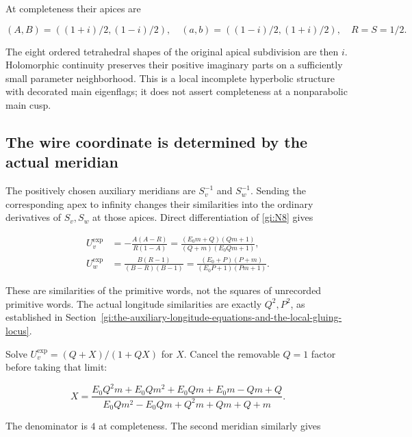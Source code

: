 At completeness their apices are

\begin{equation}\label{gi:N10}
(A,B)=((1+i)/2,(1-i)/2),\quad
 (a,b)=((1-i)/2,(1+i)/2),\quad R=S=1/2.
\end{equation}

The eight ordered tetrahedral shapes of the original apical
subdivision are then \(i\). Holomorphic continuity preserves their
positive imaginary parts on a sufficiently small parameter
neighborhood. This is a local incomplete hyperbolic structure with
decorated main eigenflags; it does not assert completeness at a
nonparabolic main cusp.

\subsection{The wire coordinate is determined by the actual meridian}\label{gi:the-wire-coordinate-is-determined-by-the-actual-meridian}

The positively chosen auxiliary meridians are \(S_v^{-1}\) and
\(S_w^{-1}\). Sending the corresponding apex to infinity changes
their similarities into the ordinary derivatives of \(S_v,S_w\)
at those apices. Direct differentiation of \eqref{gi:N8} gives

\begin{equation}\label{gi:N11}
\begin{aligned}
 U_v^{\exp}
 &=-\frac{A(A-R)}{R(1-A)}
   =\frac{(E_0m+Q)(Qm+1)}{(Q+m)(E_0Qm+1)},\\
 U_w^{\exp}
 &=\frac{B(R-1)}{(B-R)(B-1)}
   =\frac{(E_0+P)(P+m)}{(E_0P+1)(Pm+1)}.
\end{aligned}
\end{equation}

These are similarities of the primitive words, not the squares of
unrecorded primitive words. The actual longitude similarities are
exactly \(Q^2,P^2\), as established in Section~\ref{gi:the-auxiliary-longitude-equations-and-the-local-gluing-locus}.

Solve \(U_v^{\exp}=(Q+X)/(1+QX)\) for \(X\).
Cancel the removable \(Q=1\) factor before taking that limit:

\begin{equation}\label{gi:N12}
X=
 \frac{E_0Q^2m+E_0Qm^2+E_0Qm+E_0m-Qm+Q}
 {E_0Qm^2-E_0Qm+Q^2m+Qm+Q+m}.
\end{equation}

The denominator is \(4\) at completeness. The second meridian
similarly gives

